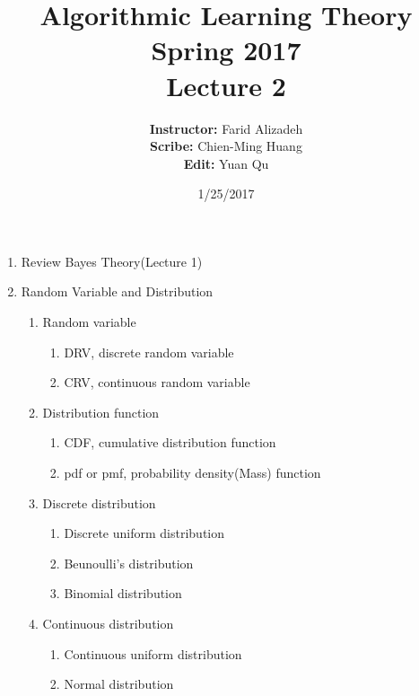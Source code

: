 \documentclass{article}
\title{ 
    Algorithmic Learning Theory\\
    Spring 2017\\
    Lecture 2 
}
\author{
    {\bf Instructor: } Farid Alizadeh\\
    {\bf Scribe: } Chien-Ming Huang\\
    {\bf Edit: } Yuan Qu\\
}
\date{1/25/2017}
\begin{document}
\pagestyle{fancy}



\maketitle

\medskip

\begin{enumerate}
    \item Review Bayes Theory(Lecture 1) 
    \item Random Variable and Distribution
        \begin{enumerate}
            \item Random variable
                \begin{enumerate}
                    \item DRV, discrete random variable
                    \item CRV, continuous random variable
                \end{enumerate}
            \item Distribution function
                \begin{enumerate}
                    \item CDF, cumulative distribution function
                    \item pdf or pmf, probability density(Mass) function
                \end{enumerate}
            \item Discrete distribution
                \begin{enumerate}
                    \item Discrete uniform distribution
                    \item Beunoulli's distribution
                    \item Binomial distribution
                \end{enumerate}
            \item Continuous distribution
                \begin{enumerate}
                    \item Continuous uniform distribution
                    \item Normal distribution
                \end{enumerate}

\end{enumerate}
\end{enumerate}
\end{document}
